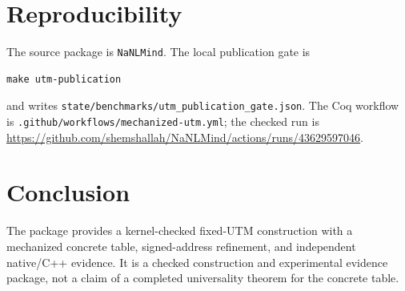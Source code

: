 \documentclass[11pt]{article}
\begin{document}
\section{Reproducibility}
The source package is \texttt{NaNLMind}.  The local publication gate is
\begin{verbatim}
make utm-publication
\end{verbatim}
and writes \texttt{state/benchmarks/utm\_publication\_gate.json}.  The Coq
workflow is \texttt{.github/workflows/mechanized-utm.yml}; the checked run is
\url{https://github.com/shemshallah/NaNLMind/actions/runs/43629597046}.

\section{Conclusion}
The package provides a kernel-checked fixed-UTM construction with a mechanized
concrete table, signed-address refinement, and independent native/C++ evidence.
It is a checked construction and experimental evidence package, not a claim of
a completed universality theorem for the concrete table.
\end{document}
